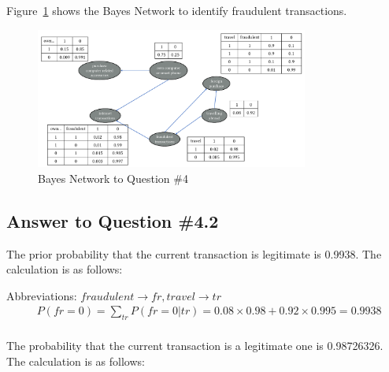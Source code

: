 \documentclass[conference]{styles/acmsiggraph}
\begin{document}
Figure~\ref{fig:q4} shows the Bayes Network to identify fraudulent transactions.

\begin{figure}[!h]
	\centering
	\includegraphics[width=0.8\textwidth]{figures/q4.pdf}
	\caption{Bayes Network to Question \#4}
	\label{fig:q4}
\end{figure}

\subsection{Answer to Question \#4.2}


The prior probability that the current transaction is legitimate is 0.9938. The calculation is as follows:

Abbreviations: $fraudulent \to fr, travel \to tr$
\begin{equation}
	\begin{aligned}
		& P(fr=0)=\sum_{tr} P(fr=0|tr) = 0.08 \times 0.98 +0.92 \times 0.995=0.9938\\
	\end{aligned}
\end{equation}


The probability that the current transaction is a legitimate one is 0.98726326. The calculation is as follows:
\end{document}
